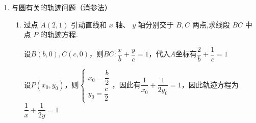 \begin{enumerate}
\begin{enumerate}
\begin{jieda}
\begin{enumerate}
                因为点 $A$ 在轨迹 $C$ 上运动, 由 (1) 有 ${\left( 3x - {12}\right) }^{2} + {\left( 3y\right) }^{2} = 2$ , 化简得 ${\left( x - 4\right) }^{2} + {y}^{2} = \dfrac{2}{9}$ , 即点 $Q$ 的轨迹方程为 ${\left( x - 4\right) }^{2} + {y}^{2} = \dfrac{2}{9}$ .
            \end{enumerate}
        \end{jieda}
        \item 已知定点 $A\left( {2,0}\right)$ 及圆 ${x}^{2} + {y}^{2} = 1$ 上的动点 $Q,\angle {AOQ}$ 的角平分线交 ${AQ}$ 于点 $P(O$ 为坐标原点),求动点 $P$ 的轨迹方程
        \begin{jieda}
            根据角分线定理有$\left| {PA}\right|  = 2\left| {PQ}\right|$. 设点 $P$ 的坐标为$(x, y)$,则 $Q\left( {\dfrac{2 - {3x}}{1 - 3},\dfrac{0 - {3y}}{1 - 3}}\right)$ ,即 $Q\left( {\dfrac{{3x} - 2}{2},\dfrac{3y}{2}}\right)$ , 代入圆的方程,得 ${\left( \dfrac{{3x} - 2}{2}\right) }^{2} + {\left( \dfrac{3y}{2}\right) }^{2} = 1$ ,整理得 ${\left( x - \dfrac{2}{3}\right) }^{2} + {y}^{2} = \dfrac{4}{9}$ (除去点 $\left( {\dfrac{4}{3},0}\right)$ ).
        \end{jieda}
    \end{enumerate}
    \item 与圆有关的轨迹问题（消参法）
    \begin{enumerate}
        \item 过点 $A\left( {2,1}\right)$ 引动直线和 $x$ 轴、 $y$ 轴分别交于 $B,C$ 两点,求线段 ${BC}$ 中点 $P$ 的轨迹方程.
        \begin{jieda}
            设$B(b, 0), C(c, 0)$，则$BC: \dfrac{x}{b} + \dfrac{y}{c} = 1$，代入$A$坐标有$\dfrac{2}{b} + \dfrac{1}{c} = 1$

            设$P(x_0, y_0)$，则$\left\{\begin{array}{l}
                 x_0 = \dfrac{b}{2} \\
                 y_0 = \dfrac{c}{2}
            \end{array}\right.$，因此有$\dfrac{1}{x_0} + \dfrac{1}{2y_0} = 1$，因此轨迹方程为$\dfrac{1}{x} + \dfrac{1}{2y} = 1$
        \end{jieda}
        

\end{enumerate}
\end{enumerate}
